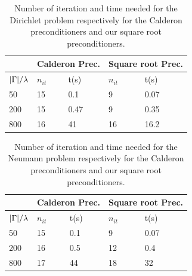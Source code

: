 \documentclass[a4paper]{article}
\begin{document}
\begin{table}[H]
	\begin{center}
		\begin{tabular}{m{4em} | m{4em} | m{4em} | m{4em} | m{4em}} 
			\hline
			\multicolumn{1}{c|}{ }&
			\multicolumn{2}{c|}{Calderon Prec.}&\multicolumn{2}{c}{Square root Prec.}\\
			\hline
			${\left\lvert \Gamma \right\rvert}/{\lambda}$ & $n_{it}$& t(s) & $n_{it}$ & t(s)\\
			\hline\hline
			50 & 15 & 0.1 & 9 & 0.07\\
			\hline
			200 & 15 & 0.47 & 9 &  0.35\\
			\hline
			800 & 16 & 41 & 16 & 16.2\\
			\hline
		\end{tabular}
	\end{center}
	\caption{Number of iteration and time needed for the Dirichlet problem respectively for the Calderon preconditioners and our square root preconditioners.}
	\label{TableBrunoVsSqrtDir}
\end{table}
\begin{table}[H]
	\begin{center}
		\begin{tabular}{m{4em} | m{4em} | m{4em} | m{4em} | m{4em}} 
			\hline
			\multicolumn{1}{c|}{ }&
			\multicolumn{2}{c|}{Calderon Prec.}&\multicolumn{2}{c}{Square root Prec.}\\
			\hline
			${\left\lvert \Gamma \right\rvert}/{\lambda}$ & $n_{it}$& t(s) & $n_{it}$ & t(s)\\
			\hline\hline
			50 & 15 & 0.1 & 9 & 0.07\\
			\hline
			200 & 16 & 0.5 & 12 & 0.4 \\
			\hline
			800 & 17 & 44 & 18 & 32\\
			\hline
		\end{tabular}
	\end{center}
	\caption{Number of iteration and time needed for the Neumann problem respectively for the Calderon preconditioners and our square root preconditioners.}
	\label{TableBrunoVsSqrtNeu}
\end{table}
	
\end{document}
